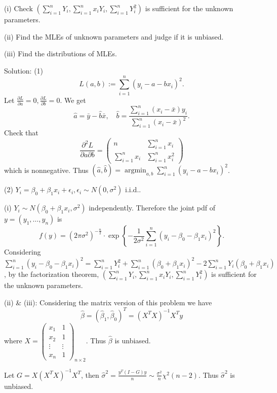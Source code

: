 (i) Check $\left(\sum_{i=1}^{n}Y_{i},\sum_{i=1}^{n}x_{i}Y_{i},\sum_{i=1}^{n}Y_{i}^{2}\right)$ is sufficient for the unknown parameters.

(ii) Find the MLEs of unknown parameters and judge if it is unbiased. 

(iii) Find the distributions of MLEs.

{Solution:}
(1)
\[
L(a,b):=\sum_{i=1}^{n}\left(y_{i}-a-bx_{i}\right)^{2}.
\]
Let $\frac{\partial L}{\partial a}=0,\frac{\partial L}{\partial b}=0$. We get
\[
\hat{a}=\bar{y}-\hat{b}\bar{x},\quad \hat{b}=\frac{\sum_{i=1}^{n}\left(x_{i}-\bar{x}\right)y_{i}}{\sum_{i=1}^{n}\left(x_{i}-\bar{x}\right)^{2}}.
\]
Check that
\[
\frac{\partial^{2}L}{\partial a\partial b}=\begin{pmatrix}n & \sum_{i=1}^{n}x_{i}\\ \sum_{i=1}^{n}x_{i} & \sum_{i=1}^{n}x_{i}^{2}\end{pmatrix}
\]
which is nonnegative. Thus $(\hat{a},\hat{b})=\operatorname{argmin}_{a,b}\sum_{i=1}^{n}(y_{i}-a-bx_{i})^{2}$.

(2) $Y_{i}=\beta_{0}+\beta_{1}x_{i}+\epsilon_{i},\epsilon_{i}\sim N\left(0,\sigma^{2}\right)$ i.i.d..

(i) $Y_{i}\sim N\left(\beta_{0}+\beta_{1}x_{i},\sigma^{2}\right)$ independently. Therefore the joint pdf of $y=(y_{1},\ldots,y_{n})$ is
\[
f(y)=\left(2\pi\sigma^{2}\right)^{-\frac{n}{2}}\cdot\exp\left\{-\frac{1}{2\sigma^{2}}\sum_{i=1}^{n}\left(y_{i}-\beta_{0}-\beta_{1}x_{i}\right)^{2}\right\}.
\]
Considering $\sum_{i=1}^{n}\left(y_{i}-\beta_{0}-\beta_{1}x_{i}\right)^{2}=\sum_{i=1}^{n}Y_{i}^{2}+\sum_{i=1}^{n}\left(\beta_{0}+\beta_{1}x_{i}\right)^{2}-2\sum_{i=1}^{n}Y_{i}\left(\beta_{0}+\beta_{1}x_{i}\right)$, by the factorization theorem, $\left(\sum_{i=1}^{n}Y_{i},\sum_{i=1}^{n}x_{i}Y_{i},\sum_{i=1}^{n}Y_{i}^{2}\right)$ is sufficient for the unknown parameters.

(ii) \& (iii): Considering the matrix version of this problem we have
\[
\hat{\beta}=(\hat{\beta}_{1},\hat{\beta}_{0})^{T}=(X^{T}X)^{-1}X^{T}y
\]
where $X=\begin{pmatrix}x_{1}&1\\ x_{2}&1\\ \vdots&\vdots\\ x_{n}&1\end{pmatrix}_{n\times2}$. Thus $\hat{\beta}$ is unbiased.

Let $G=X(X^{T}X)^{-1}X^{T}$, then $\hat{\sigma}^{2}=\frac{y^{T}(I-G)y}{n}\sim\frac{\sigma^{2}}{n}\chi^{2}(n-2)$. Thus $\hat{\sigma}^{2}$ is unbiased.

